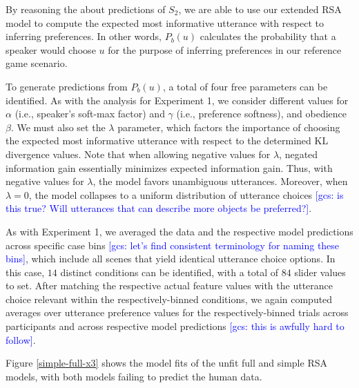 \documentclass[10pt,a4paper]{article}
\newcommand{\gcs}[1]{\textcolor{blue}{[gcs: #1]}}
\begin{document}
By reasoning the about predictions of $S_2$, we are able to use our extended RSA model to compute the expected most informative utterance with respect to inferring preferences. In other words, $P_b(u)$ calculates the probability that a speaker would choose $u$ for the purpose of inferring preferences in our reference game scenario.

To generate predictions from $P_b(u)$, a total of four free parameters can be identified. 
As with the analysis for Experiment 1, we consider different values for $\alpha$ (i.e., speaker's soft-max factor) and $\gamma$ (i.e., preference softness), and obedience $\beta$. 
We must also set the $\lambda$ parameter, which factors the importance of choosing the expected most informative utterance with respect to the determined KL divergence values.
Note that when allowing negative values for $\lambda$, negated information gain essentially minimizes expected information gain.
Thus, with negative values for $\lambda$, the model favors unambiguous utterances. 
Moreover, when $\lambda=0$, the model collapses to a uniform distribution of utterance choices \gcs{is this true? Will utterances that can describe more objects be preferred?}. 


As with Experiment 1, we averaged the data and the respective model predictions across specific case bins \gcs{let's find consistent terminology for naming these bins}, which include all scenes that yield identical utterance choice options. 
In this case, $14$ distinct conditions can be identified, with a total of $84$ slider values to set. 
After matching the respective actual feature values with the utterance choice relevant within the respectively-binned conditions, we again computed averages over utterance preference values for the respectively-binned trials across participants and across respective model predictions \gcs{this is awfully hard to follow}. 

Figure \ref{simple-full-x3} shows the model fits of the unfit full and simple RSA models, with both models failing to predict the human data.


\end{document}
